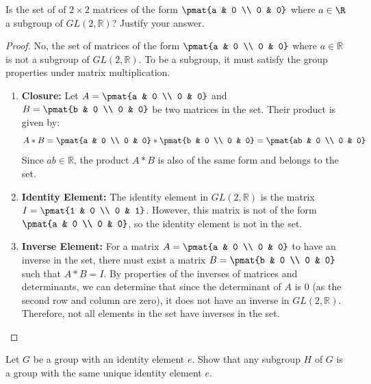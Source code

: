 \documentclass[openany]{book}
\begin{document}
\begin{exercise}
    Is the set of of $2\times 2$ matrices of the form $\pmat{a & 0 \\ 0 & 0}$ where $a \in \R$ a subgroup of $GL(2, \mathbb{R})$? Justify your answer.
\end{exercise}
\begin{proof}
    No, the set of matrices of the form $\pmat{a & 0 \\ 0 & 0}$ where $a \in \mathbb{R}$ is not a subgroup of $GL(2, \mathbb{R})$. To be a subgroup, it must satisfy the group properties under matrix multiplication.
    \begin{enumerate}
        \item \textbf{Closure:} Let $A = \pmat{a & 0 \\ 0 & 0}$ and $B = \pmat{b & 0 \\ 0 & 0}$ be two matrices in the set. Their product is given by:
        $$ A * B = \pmat{a & 0 \\ 0 & 0} * \pmat{b & 0 \\ 0 & 0} = \pmat{ab & 0 \\ 0 & 0} $$
        Since $ab \in \mathbb{R}$, the product $A * B$ is also of the same form and belongs to the set.

        \item \textbf{Identity Element:} The identity element in $GL(2, \mathbb{R})$ is the matrix $I = \pmat{1 & 0 \\ 0 & 1}$. However, this matrix is not of the form $\pmat{a & 0 \\ 0 & 0}$, so the identity element is not in the set.

        \item \textbf{Inverse Element:} For a matrix $A = \pmat{a & 0 \\ 0 & 0}$ to have an inverse in the set, there must exist a matrix $B = \pmat{b & 0 \\ 0 & 0}$ such that $A * B = I$. By properties of the inverses of matrices and determinants, we can determine that since the determinant of $A$ is $0$ (as the second row and column are zero), it does not have an inverse in $GL(2, \mathbb{R})$. Therefore, not all elements in the set have inverses in the set.
    \end{enumerate}
\end{proof}
\begin{exercise}
    Let $G$ be a group with an identity element $e$. Show that any subgroup $H$ of $G$ is a group with the same unique identity element $e$.
\end{exercise}
\end{document}
